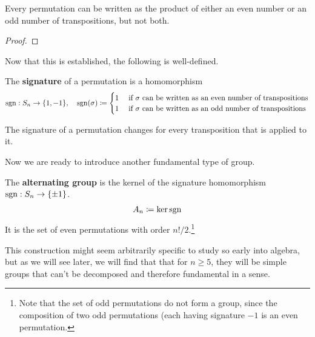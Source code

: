   \begin{lemma}
    \label{thm:parity-of-transpositions}
    Every permutation can be written as the product of either an even number or an odd number of transpositions, but not both. 
  \end{lemma}
  \begin{proof}
    
  \end{proof}

  Now that this is established, the following is well-defined. 

  \begin{definition}[Signature]
		\label{def:signature}
    The \textbf{signature} of a permutation is a homomorphism
    \begin{equation}
			\operatorname{sgn} : S_{n} \to \{1, -1\}, \quad \operatorname{sgn}(\sigma) \coloneqq \begin{cases} 
				1 & \text{ if } \sigma \text{ can be written as an even number of transpositions}  \\
				1 & \text{ if } \sigma \text{ can be written as an odd number of transpositions} 
			\end{cases}
    \end{equation}
  \end{definition}

  \begin{lemma}
    \label{thm:transpositions-flip-the-signature}
    The signature of a permutation changes for every transposition that is applied to it. 
  \end{lemma} 

  Now we are ready to introduce another fundamental type of group. 

  \begin{definition}
    \label{def:alternating-group}
    The \textbf{alternating group} is the kernel of the signature homomorphism $\operatorname{sgn}: S_n \to \{\pm 1\}$. 
    \begin{equation}
      A_n \coloneqq \ker{\operatorname{sgn}}
    \end{equation}
    It is the set of even permutations with order $n!/2$.\footnote{Note that the set of odd permutations do not form a group, since the composition of two odd permutations (each having signature $-1$ is an even permutation. }
  \end{definition}

  This construction might seem arbitrarily specific to study so early into algebra, but as we will see later, we will find that that for $n \geq 5$, they will be simple groups that can't be decomposed and therefore fundamental in a sense. 

